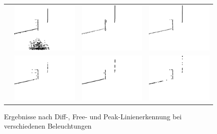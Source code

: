\documentclass[ngerman,a4paper,parskip=half]{scrartcl}
\begin{document}
\begin{figure}[H]
\begin{tabular}{c|c|c|c}
		\rotatebox{90}{\hspace{3em} Free} &
		\includegraphics[width=.3\textwidth]{includes/blue_d_free.png} & 
		\includegraphics[width=.3\textwidth]{includes/blue_t_free.png} &
		\includegraphics[width=.3\textwidth]{includes/blue_dt_free.png} \\
		
		\rotatebox{90}{\hspace{3em} Peak} &
		\includegraphics[width=.3\textwidth]{includes/blue_d_peak.png} & 
		\includegraphics[width=.3\textwidth]{includes/blue_t_peak.png} &
		\includegraphics[width=.3\textwidth]{includes/blue_dt_peak.png}
		
	\end{tabular}
	\caption{Ergebnisse nach Diff-, Free- und Peak-Linienerkennung bei verschiedenen Beleuchtungen}
	\label{fig:lights}
\end{figure}
\end{document}

